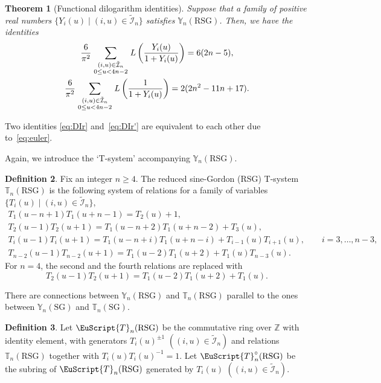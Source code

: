 \documentclass[pdftex]{sigma}
\numberwithin{equation}{section}
\newtheorem{Theorem}{Theorem}[section]
\theoremstyle{definition}
\newtheorem{Definition}[Theorem]{Definition}
\begin{document}
\begin{Theorem}[Functional dilogarithm identities]
\label{thm:dilogr}
Suppose that a family of positive real numbers
$\{ Y_i(u) \mid (i,u)\in \tilde{\mathcal{I}}_n\}$ satisfies
$\mathbb{Y}_n(\mathrm{RSG})$.
Then, we have the identities
\begin{gather}
\label{eq:DIr}
\frac{6}{\pi^2}
\sum_{
\genfrac{}{}{0pt}{1}
{
(i,u)\in \tilde{\mathcal{I}}_{n}
}
{
0\leq u < 4n-2
}
}
L\left(
\frac{Y_i(u)}{1+Y_i(u)}
\right)
=6(2n-5),\\
\label{eq:DIr'}
\frac{6}{\pi^2}
\sum_{
\genfrac{}{}{0pt}{1}
{
(i,u)\in \tilde{\mathcal{I}}_{n}
}
{
0\leq u < 4n-2
}
}
L\left(
\frac{1}{1+Y_i(u)}
\right)
=2(2n^2-11n+17).
\end{gather}
\end{Theorem}
Two identities
\eqref{eq:DIr} and~\eqref{eq:DIr'}
are equivalent to each other due to~\eqref{eq:euler}.


Again, we introduce
the `T-system' accompanying $\mathbb{Y}_{n}(\mathrm{RSG})$.
\begin{Definition}
Fix an integer $n \geq 4$.
The reduced sine-Gordon (RSG)
T-system $\mathbb{T}_{n}(\mathrm{RSG})$
is the following system of relations for
a family of variables
 $\{T_i(u) \mid (i,u)\in \tilde{\mathcal{I}}_n \}$,
\begin{gather}
T_1\left(u-n+1\right)
T_1\left(u+n-1\right)
=
T_2(u)+1,\nonumber\\
T_2(u-1) T_2(u+1)
=
T_1(u-n+2)T_1(u+n-2)+T_3(u),
\nonumber\\
T_i(u-1)T_i(u+1)
=
T_1(u-n+i)T_1(u+n-i)
+ T_{i-1}(u)T_{i+1}(u), \qquad i=3,\dots,n-3,\nonumber\\
T_{n-2}(u-1)T_{n-2}(u+1)
=
T_1(u-2)T_1(u+2)
+ T_1(u) T_{n-3}(u).\label{eq:T1r}
\end{gather}
For $n=4$, the second  and the fourth relations are replaced with
\[
T_2(u-1) T_2(u+1)
=
T_1(u-2)T_1(u+2)+T_1(u).
\]
\end{Definition}

There are connections between
$\mathbb{Y}_{n}(\mathrm{RSG})$ and $\mathbb{T}_{n}(\mathrm{RSG})$
parallel to the ones
between
$\mathbb{Y}_{n}(\mathrm{SG})$ and $\mathbb{T}_{n}(\mathrm{SG})$.

\begin{Definition}
\label{defn:TCr}
Let $\EuScript{T}_{n}(\mathrm{RSG})$
be the commutative ring over $\mathbb{Z}$
with identity element,  with generators
$T_i(u)^{\pm 1}$ $((i,u)\in \tilde{\mathcal{I}}_{n})$
and relations $\mathbb{T}_{n}(\mathrm{RSG})$
together with $T_i(u)T_i(u)^{-1}=1$.
Let $\EuScript{T}^{\circ}_{n}(\mathrm{RSG})$
be the subring of $\EuScript{T}_{n}(\mathrm{RSG})$
generated by
$T_i(u)$ $((i,u)\in \tilde{\mathcal{I}}_{n})$.
\end{Definition}
\end{document}
